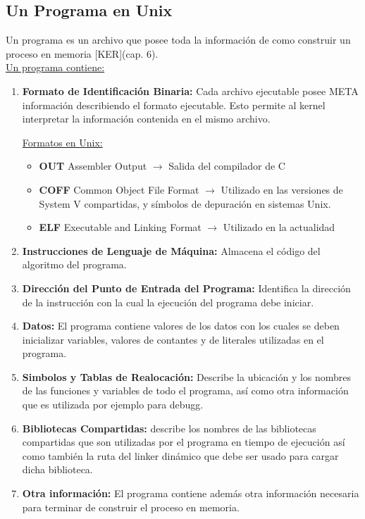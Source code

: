 \documentclass[../main.tex]{subfiles}
\begin{document}
\subsection{Un Programa en Unix}
    Un programa es un archivo que posee toda la información de como construir un proceso en memoria [KER](cap. 6).\\

    \underline{Un programa contiene:}
    \begin{enumerate}
        \item \textbf{Formato de Identificación Binaria:} Cada archivo ejecutable posee META información describiendo el formato ejecutable. Esto permite al kernel interpretar la información contenida en el mismo archivo.
        
        \underline{Formatos en Unix:}
        \begin{itemize}
            \item \textbf{OUT} Assembler Output $\rightarrow$ Salida del compilador de C
            \item \textbf{COFF} Common Object File Format $\rightarrow$ Utilizado en las versiones de System V compartidas, y símbolos de depuración en sistemas Unix.
            \item \textbf{ELF} Executable and Linking Format $\rightarrow$ Utilizado en la actualidad
            
        \end{itemize}

        \item \textbf{Instrucciones de Lenguaje de Máquina:} Almacena el código del algoritmo del programa.
        \item \textbf{Dirección del Punto de Entrada del Programa:} Identifica la dirección de la instrucción con la cual la ejecución del programa debe iniciar.
        \item \textbf{Datos:} El programa contiene valores de los datos con los cuales se deben inicializar variables, valores de contantes y de literales utilizadas en el programa.
        \item \textbf{Simbolos y Tablas de Realocación:} Describe la ubicación y los nombres de las funciones y variables de todo el programa, así como otra información que es utilizada por ejemplo para debugg.
        \item \textbf{Bibliotecas Compartidas:} describe los nombres de las bibliotecas compartidas que son utilizadas por el programa en tiempo de ejecución así como también la ruta del linker dinámico que debe ser usado para cargar dicha biblioteca.
        \item \textbf{Otra información:} El programa contiene además otra información necesaria para terminar de construir el proceso en memoria.
    \end{enumerate}
    
\end{document}
